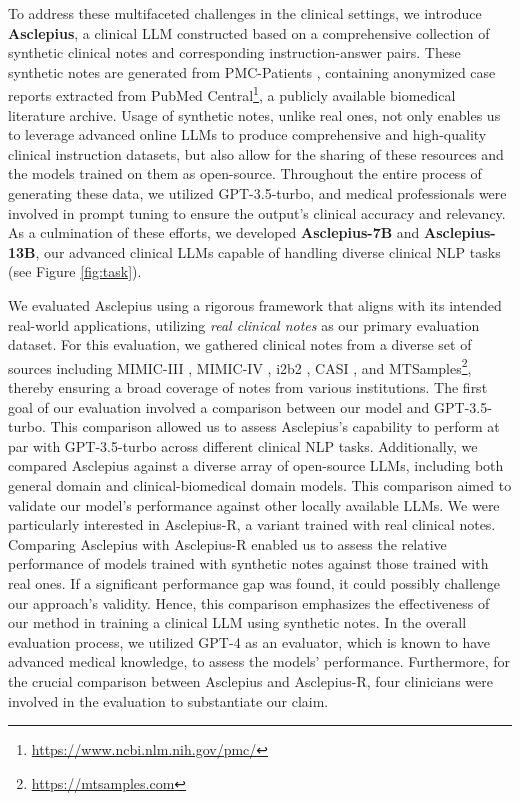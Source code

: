 \documentclass[11pt]{article}
\begin{document}
To address these multifaceted challenges in the clinical settings, we introduce \textbf{Asclepius}, a clinical LLM constructed based on a comprehensive collection of synthetic clinical notes and corresponding instruction-answer pairs. 
These synthetic notes are generated from PMC-Patients \citep{zhao2023pmcpatients}, containing anonymized case reports extracted from PubMed Central\footnote{\url{https://www.ncbi.nlm.nih.gov/pmc/}}, a publicly available biomedical literature archive.
Usage of synthetic notes, unlike real ones, not only enables us to leverage advanced online LLMs to produce comprehensive and high-quality clinical instruction datasets, but also allow for the sharing of these resources and the models trained on them as open-source.
Throughout the entire process of generating these data, we utilized GPT-3.5-turbo, and medical professionals were involved in prompt tuning to ensure the output's clinical accuracy and relevancy.
As a culmination of these efforts, we developed \textbf{Asclepius-7B} and \textbf{Asclepius-13B}, our advanced clinical LLMs capable of handling diverse clinical NLP tasks (see Figure \ref{fig:task}).



We evaluated Asclepius using a rigorous framework that aligns with its intended real-world applications, utilizing \textit{real clinical notes} as our primary evaluation dataset.
For this evaluation, we gathered clinical notes from a diverse set of sources including MIMIC-III \citep{johnson2016mimic}, MIMIC-IV \citep{johnson2023mimic}, i2b2 \citep{uzuner2007evaluating}, CASI \citep{moon2014sense}, and MTSamples\footnote{\url{https://mtsamples.com}}, thereby ensuring a broad coverage of notes from various institutions.
The first goal of our evaluation involved a comparison between our model and GPT-3.5-turbo. 
This comparison allowed us to assess Asclepius's capability to perform at par with GPT-3.5-turbo across different clinical NLP tasks. 
Additionally, we compared Asclepius against a diverse array of open-source LLMs, including both general domain and clinical-biomedical domain models.
This comparison aimed to validate our model's performance against other locally available LLMs.
We were particularly interested in Asclepius-R, a variant trained with real clinical notes.
Comparing Asclepius with Asclepius-R enabled us to assess the relative performance of models trained with synthetic notes against those trained with real ones.
If a significant performance gap was found, it could possibly challenge our approach's validity.
Hence, this comparison emphasizes the effectiveness of our method in training a clinical LLM using synthetic notes.
In the overall evaluation process, we utilized GPT-4 as an evaluator, which is known to have advanced medical knowledge, to assess the models' performance. 
Furthermore, for the crucial comparison between Asclepius and Asclepius-R, four clinicians were involved in the evaluation to substantiate our claim.
\end{document}
